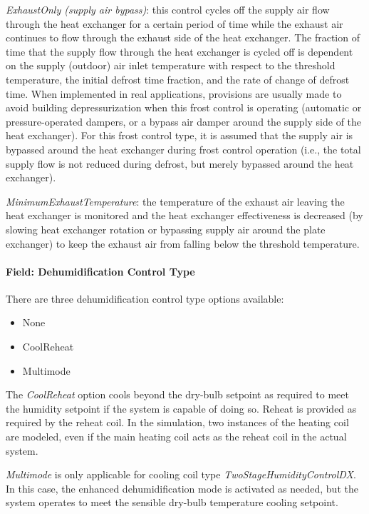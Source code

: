 \emph{ExhaustOnly (supply air bypass)}: this control cycles off the supply air flow through the heat exchanger for a certain period of time while the exhaust air continues to flow through the exhaust side of the heat exchanger. The fraction of time that the supply flow through the heat exchanger is cycled off is dependent on the supply (outdoor) air inlet temperature with respect to the threshold temperature, the initial defrost time fraction, and the rate of change of defrost time. When implemented in real applications, provisions are usually made to avoid building depressurization when this frost control is operating (automatic or pressure-operated dampers, or a bypass air damper around the supply side of the heat exchanger). For this frost control type, it is assumed that the supply air is bypassed around the heat exchanger during frost control operation (i.e., the total supply flow is not reduced during defrost, but merely bypassed around the heat exchanger).

\emph{MinimumExhaustTemperature}: the temperature of the exhaust air leaving the heat exchanger is monitored and the heat exchanger effectiveness is decreased (by slowing heat exchanger rotation or bypassing supply air around the plate exchanger) to keep the exhaust air from falling below the threshold temperature.

\paragraph{Field: Dehumidification Control Type}\label{field-dehumidification-control-type-2}

There are three dehumidification control type options available:

\begin{itemize}
\item
  None
\item
  CoolReheat
\item
  Multimode
\end{itemize}

The \emph{CoolReheat} option cools beyond the dry-bulb setpoint as required to meet the humidity setpoint if the system is capable of doing so. Reheat is provided as required by the reheat coil. In the simulation, two instances of the heating coil are modeled, even if the main heating coil acts as the reheat coil in the actual system.

\emph{Multimode} is only applicable for cooling coil type \emph{TwoStageHumidityControlDX}. In this case, the enhanced dehumidification mode is activated as needed, but the system operates to meet the sensible dry-bulb temperature cooling setpoint.

